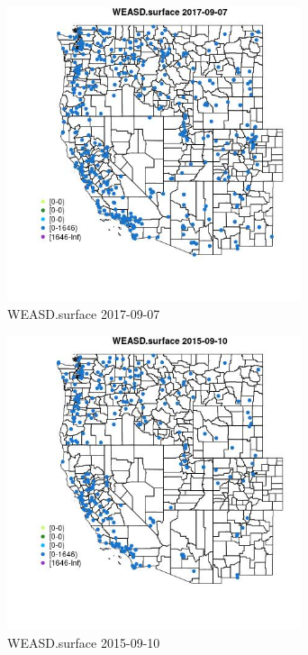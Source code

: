 \begin{figure} 
\centering  
\includegraphics[width=0.77\textwidth]{Code_Outputs/Report_ML_input_PM25_Step4_part_e_de_duplicated_aves_compiled_2019-05-20wNAs_MapObsWEASDsurface2017-09-07.jpg} 
\caption{\label{fig:Report_ML_input_PM25_Step4_part_e_de_duplicated_aves_compiled_2019-05-20wNAsMapObsWEASDsurface2017-09-07}WEASD.surface 2017-09-07} 
\end{figure} 
 

\begin{figure} 
\centering  
\includegraphics[width=0.77\textwidth]{Code_Outputs/Report_ML_input_PM25_Step4_part_e_de_duplicated_aves_compiled_2019-05-20wNAs_MapObsWEASDsurface2015-09-10.jpg} 
\caption{\label{fig:Report_ML_input_PM25_Step4_part_e_de_duplicated_aves_compiled_2019-05-20wNAsMapObsWEASDsurface2015-09-10}WEASD.surface 2015-09-10} 
\end{figure} 
 

